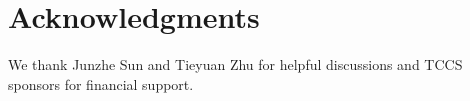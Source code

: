 \section{Acknowledgments}
We thank Junzhe Sun and Tieyuan Zhu for helpful discussions and TCCS sponsors for
financial support.

\onecolumn


